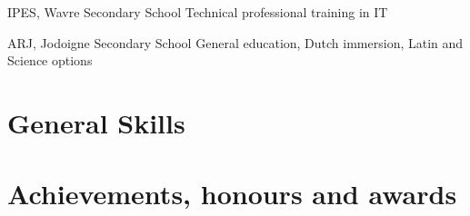 \documentclass[%
    doublesided,
    paper=a4,
    fontsize=10pt,
hidelinks
]{my-resume}
\begin{document}
{        
        {IPES, Wavre}
        {Secondary School}
        {Technical professional training in IT}

        {ARJ, Jodoigne}
        {Secondary School}
        {General education, Dutch immersion, Latin and Science options}

        \section{General Skills}
        \smallskip %

        \section{Achievements, honours and awards}

        \medskip
    }
    \makebody
\end{document}
